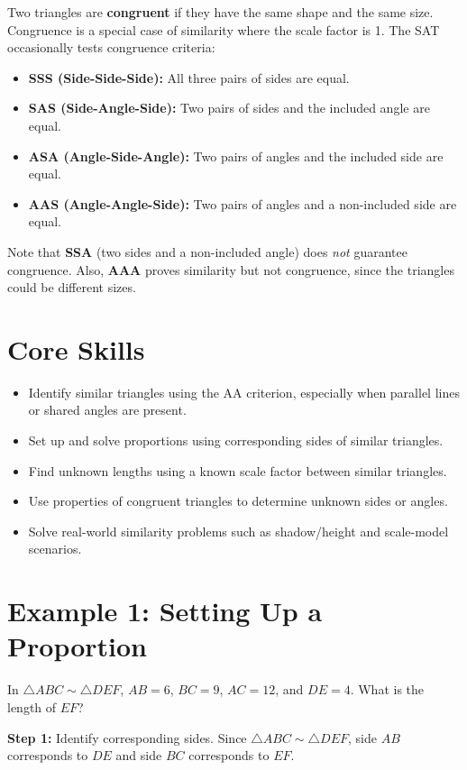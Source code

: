\documentclass[14pt]{extarticle}
\begin{document}
Two triangles are \textbf{congruent} if they have the same shape and the same size. Congruence is a special case of similarity where the scale factor is 1. The SAT occasionally tests congruence criteria:

\begin{itemize}
  \item \textbf{SSS (Side-Side-Side):} All three pairs of sides are equal.
  \item \textbf{SAS (Side-Angle-Side):} Two pairs of sides and the included angle are equal.
  \item \textbf{ASA (Angle-Side-Angle):} Two pairs of angles and the included side are equal.
  \item \textbf{AAS (Angle-Angle-Side):} Two pairs of angles and a non-included side are equal.
\end{itemize}

Note that \textbf{SSA} (two sides and a non-included angle) does \textit{not} guarantee congruence. Also, \textbf{AAA} proves similarity but not congruence, since the triangles could be different sizes.

\section*{Core Skills}
\begin{itemize}
  \item Identify similar triangles using the AA criterion, especially when parallel lines or shared angles are present.
  \item Set up and solve proportions using corresponding sides of similar triangles.
  \item Find unknown lengths using a known scale factor between similar triangles.
  \item Use properties of congruent triangles to determine unknown sides or angles.
  \item Solve real-world similarity problems such as shadow/height and scale-model scenarios.
\end{itemize}

\section*{Example 1: Setting Up a Proportion}

In \(\triangle ABC \sim \triangle DEF\), \(AB = 6\), \(BC = 9\), \(AC = 12\), and \(DE = 4\). What is the length of \(EF\)?

\textbf{Step 1:} Identify corresponding sides. Since \(\triangle ABC \sim \triangle DEF\), side \(AB\) corresponds to \(DE\) and side \(BC\) corresponds to \(EF\).
\end{document}
